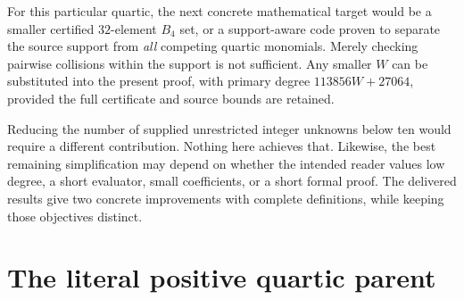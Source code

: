 \documentclass[11pt,letterpaper]{article}
\theoremstyle{remark}
\begin{document}
For this particular quartic, the next concrete mathematical target
would be a smaller certified \(32\)-element \(B_4\) set, or a
support-aware code proven to separate the source support from
\emph{all} competing quartic monomials. Merely checking pairwise
collisions within the support is not sufficient. Any smaller \(W\)
can be substituted into the present proof, with primary degree
\(113856W+27064\), provided the full certificate and source bounds
are retained.

Reducing the number of supplied unrestricted integer unknowns below
ten would require a different contribution. Nothing here achieves
that. Likewise, the best remaining simplification may depend on
whether the intended reader values low degree, a short evaluator,
small coefficients, or a short formal proof. The delivered results
give two concrete improvements with complete definitions, while
keeping those objectives distinct.

\appendix
\section{The literal positive quartic parent}
\label{app:parent}
\end{document}
